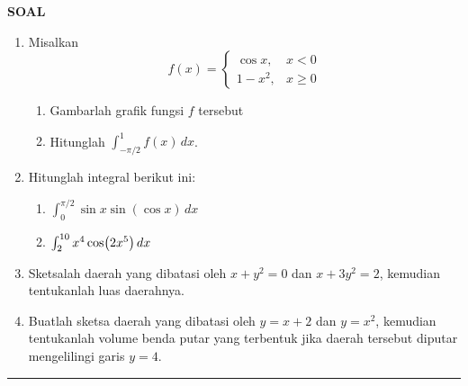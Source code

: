 \begin{center}
\textbf{\large{SOAL}}
\end{center}
\begin{enumerate}[leftmargin=*, label={\arabic*}.]
\item Misalkan
\[
f(x) = 
\begin{cases}
    \cos x, & x < 0\\
    1-x^{2}, &x \geq 0
\end{cases}
\]
    \begin{enumerate}[label={\alph*}.]
    \item Gambarlah grafik fungsi $f$ tersebut
    \item Hitunglah $\int_{-\pi/2}^{1}f(x)\,dx$.
    \end{enumerate}
\item Hitunglah integral berikut ini:
    \begin{enumerate}[label={\alph*}.]
    \item $\int_{0}^{\pi/2} \sin x \sin(\cos x) \,dx$
    \item $\int_{2}^{10} x^{4}\cos\brk*{2x^5}\,dx$
    \end{enumerate}
\item Sketsalah daerah yang dibatasi oleh $x+y^2=0$ dan $x+3y^{2}=2$, 
kemudian tentukanlah luas daerahnya.
\item Buatlah sketsa daerah yang dibatasi oleh $y=x+2$ dan $y=x^{2}$, 
kemudian tentukanlah volume benda putar yang terbentuk jika daerah 
tersebut diputar mengelilingi garis $y=4$.
\end{enumerate}


\vspace{0.2cm}\hrule height 1pt\vspace{0.5cm}


